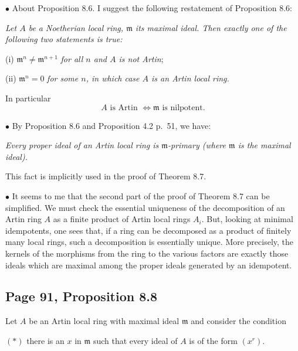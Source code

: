 \documentclass[parskip=half,fontsize=12pt]{scrartcl}%
\newcommand{\mf}{\mathfrak}
\newcommand{\bu}{\bullet}
\begin{document}
$\bu$ About Proposition 8.6. I suggest the following restatement of Proposition 8.6:

\emph{Let $A$ be a Noetherian local ring, $\mf m$ its maximal ideal. Then exactly one of the following two statements is true:}

(i) $\mf m^n\ne\mf m^{n+1}$ \emph{for all $n$ and $A$ is \emph{not} Artin};

(ii) $\mf m^n=0$ \emph{for some $n$, in which case $A$ is an Artin local ring.}

In particular 
\begin{equation}\label{86}
A\text{ is Artin $\iff\mf m$ is nilpotent.}
\end{equation}%

$\bu$ By Proposition 8.6 and Proposition 4.2 p.~51, we have:

\emph{Every proper ideal of an Artin local ring is $\mf m$-primary (where $\mf m$ is the maximal ideal).} 

This fact is implicitly used in the proof of Theorem 8.7.

$\bu$ It seems to me that the second part of the proof of Theorem 8.7 can be simplified. We must check the essential uniqueness of the decomposition of an Artin ring $A$ as a finite product of Artin local rings $A_i$. But, looking at minimal idempotents, one sees that, if a ring can be decomposed as a product of finitely many local rings, such a decomposition is essentially unique. More precisely, the kernels of the morphisms from the ring to the various factors are exactly those ideals which are maximal among the proper ideals generated by an idempotent. %

\subsection{Page 91, Proposition 8.8}\label{88}%

Let $A$ be an Artin local ring with maximal ideal $\mf m$ and consider the condition

$(*)$ there is an $x$ in $\mf m$ such that every ideal of $A$ is of the form $(x^r)$. 
\end{document}
